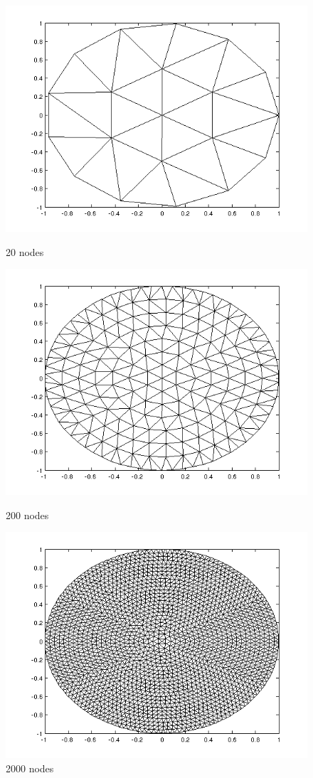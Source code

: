 \documentclass[paper=a4, fontsize=11pt]{scrartcl} %
\begin{document}
\begin{figure}[!htb]
  \includegraphics[width=\linewidth]{2d20.png}
  \caption{20 nodes}\label{fig:2d20}
\endminipage\hfill
{}
  \includegraphics[width=\linewidth]{2d200.png}
  \caption{200 nodes}\label{fig:2d200}
\endminipage\hfill
{}%
  \includegraphics[width=\linewidth]{2d2000.png}
  \caption{2000 nodes}\label{fig:2d2000}
\endminipage
\end{figure}
\end{document}
